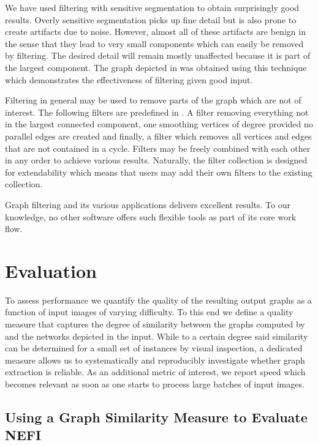 		We have used filtering with sensitive segmentation to obtain surprisingly good results. Overly sensitive segmentation picks up fine detail but is also prone to create artifacts due to noise. However, almost all of these artifacts are benign in the sense that they lead to very small components which can easily be removed by filtering. The desired detail will remain mostly unaffected because it is part of the largest component. The graph depicted in  was obtained using this technique which demonstrates the effectiveness of filtering given good input.

		Filtering in general may be used to remove parts of the graph which are not of interest. The following filters are predefined in \NEFI. A filter removing everything not in the largest connected component, one smoothing vertices of degree provided no parallel edges are created and finally, a filter which removes all vertices and edges that are not contained in a cycle. Filters may be freely combined with each other in any order to achieve various results. Naturally, the filter collection is designed for extendability which means that users may add their own filters to the existing collection.

		Graph filtering and its various applications delivers excellent results. To our knowledge, no other software offers such flexible tools as part of its core work flow.

\section{Evaluation}\label{sec:evaluation_general}

	To assess \NEFIs performance we quantify the quality of the resulting output graphs as a function of input images of varying difficulty. To this end we define a quality measure that captures the degree of similarity between the graphs computed by \NEFI and the networks depicted in the input. While to a certain degree said similarity can be determined for a small set of instances by visual inspection, a dedicated measure allows us to systematically and reproducibly investigate whether \NEFIs graph extraction is reliable. As an additional metric of interest, we report \NEFIs speed which becomes relevant as soon as one starts to process large batches of input images. 
 
	\subsection{Using a Graph Similarity Measure to Evaluate NEFI}

